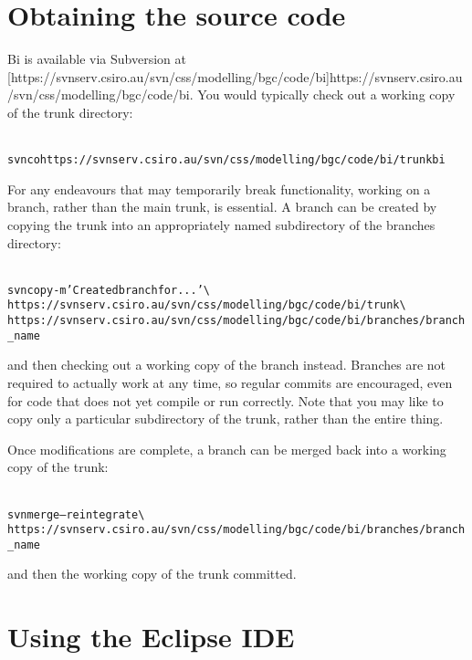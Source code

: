 \section{Obtaining the source code}

Bi is available via Subversion at
\hyperref[hyper][https://svnserv.csiro.au/svn/css/modelling/bgc/code/bi]{https://svnserv.csiro.au/svn/css/modelling/bgc/code/bi}. You
would typically check out a working copy of the \textsf{trunk} directory:
\begin{alltt}{\sf
svn co https://svnserv.csiro.au/svn/css/modelling/bgc/code/bi/trunk bi
}\end{alltt}

For any endeavours that may temporarily break functionality, working on a
branch, rather than the main trunk, is essential. A branch can be created by
copying the trunk into an appropriately named subdirectory of the
\textsf{branches} directory:
\begin{alltt}{\sf
svn copy -m 'Created branch for...' \textbackslash
  https://svnserv.csiro.au/svn/css/modelling/bgc/code/bi/trunk \textbackslash
  https://svnserv.csiro.au/svn/css/modelling/bgc/code/bi/branches/branch_name
}\end{alltt}
and then checking out a working copy of the branch instead. Branches are not
required to actually work at any time, so regular commits are encouraged, even
for code that does not yet compile or run correctly. Note that you may like to
copy only a particular subdirectory of the trunk, rather than the entire
thing.

Once modifications are complete, a branch can be merged back into a working
copy of the trunk:
\begin{alltt}{\sf
svn merge --reintegrate \textbackslash
  https://svnserv.csiro.au/svn/css/modelling/bgc/code/bi/branches/branch_name
}\end{alltt}
and then the working copy of the trunk committed.

\section{Using the Eclipse IDE}

